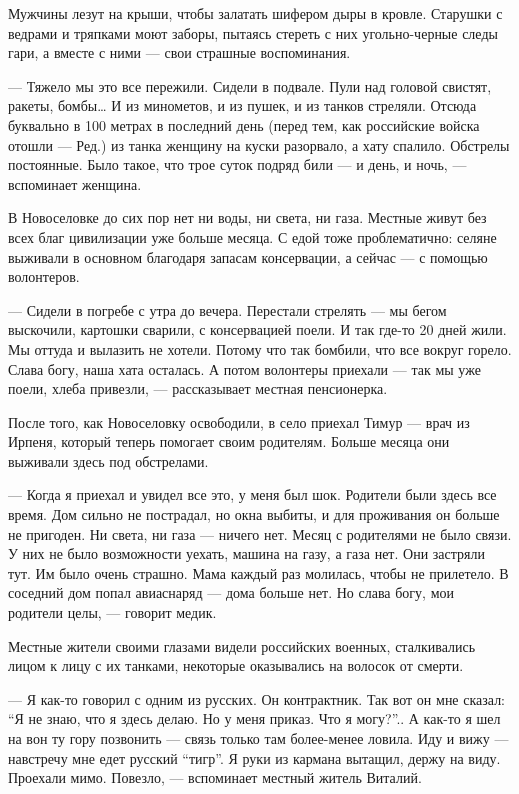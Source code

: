 Мужчины лезут на крыши, чтобы залатать шифером дыры в кровле. Старушки с
ведрами и тряпками моют заборы, пытаясь стереть с них угольно-черные следы
гари, а вместе с ними — свои страшные воспоминания.

— Тяжело мы это все пережили. Сидели в подвале. Пули над головой свистят,
ракеты, бомбы… И из минометов, и из пушек, и из танков стреляли. Отсюда
буквально в 100 метрах в последний день (перед тем, как российские войска
отошли — Ред.) из танка женщину на куски разорвало, а хату спалило. Обстрелы
постоянные. Было такое, что трое суток подряд били — и день, и ночь, —
вспоминает женщина.

В Новоселовке до сих пор нет ни воды, ни света, ни газа. Местные живут без всех
благ цивилизации уже больше месяца. С едой тоже проблематично: селяне выживали
в основном благодаря запасам консервации, а сейчас — с помощью волонтеров.

— Сидели в погребе с утра до вечера. Перестали стрелять — мы бегом выскочили,
картошки сварили, с консервацией поели. И так где-то 20 дней жили. Мы оттуда и
вылазить не хотели. Потому что так бомбили, что все вокруг горело. Слава богу,
наша хата осталась. А потом волонтеры приехали — так мы уже поели, хлеба
привезли, — рассказывает местная пенсионерка.

После того, как Новоселовку освободили, в село приехал Тимур — врач из Ирпеня,
который теперь помогает своим родителям. Больше месяца они выживали здесь под
обстрелами.

— Когда я приехал и увидел все это, у меня был шок. Родители были здесь все
время. Дом сильно не пострадал, но окна выбиты, и для проживания он больше не
пригоден. Ни света, ни газа — ничего нет. Месяц с родителями не было связи. У
них не было возможности уехать, машина на газу, а газа нет. Они застряли тут.
Им было очень страшно. Мама каждый раз молилась, чтобы не прилетело. В соседний
дом попал авиаснаряд — дома больше нет. Но слава богу, мои родители целы, —
говорит медик.

Местные жители своими глазами видели российских военных, сталкивались лицом к
лицу с их танками, некоторые оказывались на волосок от смерти. 

— Я как-то говорил с одним из русских. Он контрактник. Так вот он мне сказал:
\enquote{Я не знаю, что я здесь делаю. Но у меня приказ. Что я могу?}.. А как-то я шел
на вон ту гору позвонить — связь только там более-менее ловила. Иду и вижу —
навстречу мне едет русский \enquote{тигр}. Я руки из кармана вытащил, держу на виду.
Проехали мимо. Повезло, — вспоминает местный житель Виталий. 

